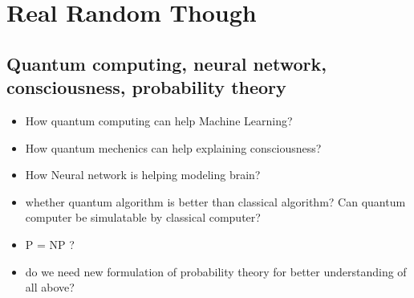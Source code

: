 \documentclass[pdf]{article}
\begin{document}
\section{Real Random Though}
\subsection{Quantum computing, neural network, consciousness, probability theory}
\begin{itemize}
\item How quantum computing can help Machine Learning?
\item How quantum mechenics can help explaining consciousness?
\item How Neural network is helping modeling brain?
\item whether quantum algorithm is better than classical algorithm? Can quantum computer be simulatable by classical computer?
\item P = NP ?
\item do we need new formulation of probability theory for better understanding of all above?
\end{itemize}
\end{document}
